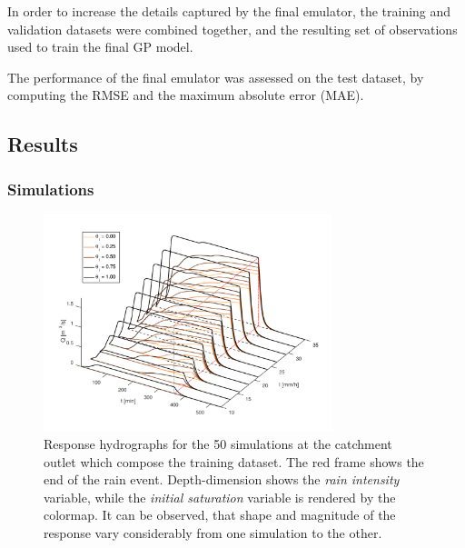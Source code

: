 In order to increase the details captured by the final emulator, the training and validation datasets were combined together, and the resulting set of observations used to train the final GP model. 
 
The performance of the final emulator was assessed on the test dataset, by computing the RMSE and the maximum absolute error (MAE).

\subsection{Results}
\subsubsection{Simulations}\label{sec:simulations_results}

\begin{figure}[h]
  \centering
  \includegraphics[width=0.75\textwidth]{Figures/hydrographs3d.png}
  \caption{Response hydrographs for the \num{50} simulations at the catchment outlet which compose the training dataset. The red frame shows the end of the rain event. Depth-dimension shows the \emph{rain intensity} variable, while the \emph{initial saturation} variable is rendered by the colormap. It can be observed, that shape and magnitude of the response vary considerably from one simulation to the other.}
  \label{fig:hydrographs3d}
\end{figure}


